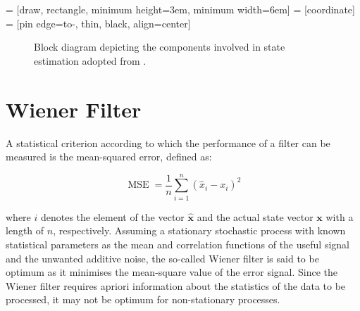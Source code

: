  = [draw, rectangle, minimum height=3em, minimum width=6em]
 = [coordinate]
 = [pin edge={to-, thin, black}, align=center]

\begin{figure}
\centering
{}
\caption{Block diagram depicting the components involved in state estimation adopted from \cite{haykin2002adaptive}.} \label{fig:state_estimation}
\end{figure}

\section{Wiener Filter}

A statistical criterion according to which the performance of a filter can be measured is the mean-squared error, defined as:

$$\operatorname{MSE}=\frac{1}{n}\sum_{i=1}^n(\hat{x}_i - x_i)^2$$

\noindent
where $i$ denotes the element of the vector  $\hat{\mathbf{x}}$ and the actual state vector $\mathbf{x}$ with a length of $n$, respectively. Assuming a stationary stochastic process with known statistical parameters as the mean and correlation functions of the useful signal and the unwanted additive noise, the so-called Wiener filter is said to be optimum as it minimises the mean-square value of the error signal. Since the Wiener filter requires apriori information about the statistics of the data to be processed, it may not be optimum for non-stationary processes.

